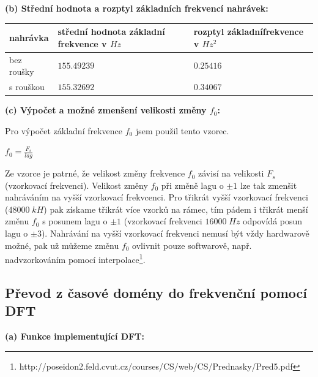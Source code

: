 \documentclass[12pt]{article}
\begin{document}
\textbf{(b) Střední hodnota a rozptyl základních frekvencí nahrávek:}
\begin{center}
\begin{tabular}{| m{} | m{} | m{} |} 
\hline
\textbf{nahrávka} & \textbf{střední hodnota základní frekvence v $Hz$} & \textbf{rozptyl základní\newline frekvence v $Hz^2$}\\
\hline
bez roušky & $155.49239$ & $0.25416$ \\ 
s rouškou & $155.32692$ & $0.34067$\\ 
\hline
\end{tabular}
\end{center}
\vspace{1em}
\textbf{(c) Výpočet a možné zmenšení velikosti změny $f_0$:}

\hspace{1.5em}Pro výpočet základní frekvence $f_0$ jsem použil tento vzorec.
\begin{center}
$f_0 = \frac{F_s}{lag}$
\end{center}
Ze vzorce je patrné, že velikost změny frekvence $f_0$ závisí na velikosti $F_s$ (vzorkovací frekvenci). Velikost změny $f_0$ při změně lagu o $\pm 1$ lze tak zmenšit nahráváním na vyšší vzorkovací frekvcenci. Pro třikrát vyšší vzorkovací frekvenci ($48 000\; kH$) pak získame třikrát více vzorků na rámec, tím pádem i třikrát menší změnu $f_0$ s posunem lagu o $\pm 1$ (vzorkovací frekvenci $16000\; Hz$ odpovídá posun lagu o $\pm 3$). Nahrávání na vyšší vzorkovací frekvenci nemusí být vždy hardwarově možné, pak už můžeme změnu $f_0$ ovlivnit pouze softwarově, např. nadvzorkováním pomocí interpolace\footnote[2]{http://poseidon2.feld.cvut.cz/courses/CS/web/CS/Prednasky/Pred5.pdf}.

\subsection{Převod z časové domény do frekvenční pomocí DFT}
\textbf{(a) Funkce implementující DFT:}
\end{document}
